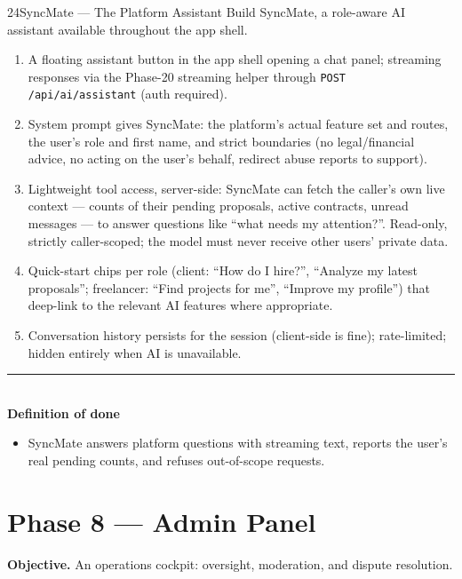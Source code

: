 \documentclass[11pt,a4paper]{article}
\newcommand{\dod}{\medskip\noindent\textcolor{donegreen}{\rule{\linewidth}{0.5pt}}\\[1mm]\textbf{\textcolor{donegreen}{Definition of done}}\\[-2mm]}
\newcommand{\objective}[1]{\noindent\textbf{Objective.} #1\medskip}
\begin{document}
\begin{promptbox}{24}{SyncMate --- The Platform Assistant}
Build SyncMate, a role-aware AI assistant available throughout the app shell.

\begin{enumerate}[leftmargin=1.6em]
  \item A floating assistant button in the app shell opening a chat panel; streaming
        responses via the Phase-20 streaming helper through
        \texttt{POST /api/ai/assistant} (auth required).
  \item System prompt gives SyncMate: the platform's actual feature set and routes,
        the user's role and first name, and strict boundaries (no legal/financial
        advice, no acting on the user's behalf, redirect abuse reports to support).
  \item Lightweight tool access, server-side: SyncMate can fetch the caller's own
        live context --- counts of their pending proposals, active contracts, unread
        messages --- to answer questions like ``what needs my attention?''. Read-only,
        strictly caller-scoped; the model must never receive other users' private
        data.
  \item Quick-start chips per role (client: ``How do I hire?'', ``Analyze my latest
        proposals''; freelancer: ``Find projects for me'', ``Improve my profile'') that
        deep-link to the relevant AI features where appropriate.
  \item Conversation history persists for the session (client-side is fine);
        rate-limited; hidden entirely when AI is unavailable.
\end{enumerate}

\dod
\begin{itemize}[leftmargin=1.6em]
  \item SyncMate answers platform questions with streaming text, reports the user's
        real pending counts, and refuses out-of-scope requests.
\end{itemize}
\end{promptbox}

\section{Phase 8 --- Admin Panel}

\objective{An operations cockpit: oversight, moderation, and dispute resolution.}
\end{document}
